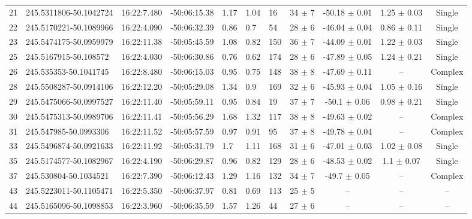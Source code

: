 \begin{table}[htbp!]
\begin{tabular}{llllllllccc}
21  &  245.5311806-50.1042724  &  16:22:7.480  &  -50:06:15.38  &  1.17  &  1.04  &  16  &  34 $\pm$ 7  &  -50.18 $\pm$ 0.01  &  1.25 $\pm$ 0.03  &  Single \\
22  &  245.5170221-50.1089966  &  16:22:4.090  &  -50:06:32.39  &  0.86  &  0.7  &  54  &  28 $\pm$ 6  &  -46.04 $\pm$ 0.04  &  0.86 $\pm$ 0.11  &  Single \\
23  &  245.5474175-50.0959979  &  16:22:11.38  &  -50:05:45.59  &  1.08  &  0.82  &  150  &  36 $\pm$ 7  &  -44.09 $\pm$ 0.01  &  1.22 $\pm$ 0.03  &  Single \\
25  &  245.5167915-50.108572  &  16:22:4.030  &  -50:06:30.86  &  0.76  &  0.62  &  174  &  28 $\pm$ 6  &  -47.89 $\pm$ 0.05  &  1.24 $\pm$ 0.21  &  Single \\
26  &  245.535353-50.1041745  &  16:22:8.480  &  -50:06:15.03  &  0.95  &  0.75  &  148  &  38 $\pm$ 8  &  -47.69 $\pm$ 0.11  &  --  &  Complex \\
28  &  245.5508287-50.0914106  &  16:22:12.20  &  -50:05:29.08  &  1.34  &  0.9  &  169  &  32 $\pm$ 6  &  -45.93 $\pm$ 0.04  &  1.05 $\pm$ 0.16  &  Single \\
29  &  245.5475066-50.0997527  &  16:22:11.40  &  -50:05:59.11  &  0.95  &  0.84  &  19  &  37 $\pm$ 7  &  -50.1 $\pm$ 0.06  &  0.98 $\pm$ 0.21  &  Single \\
30  &  245.5475313-50.0989706  &  16:22:11.41  &  -50:05:56.29  &  1.68  &  1.32  &  117  &  38 $\pm$ 8  &  -49.63 $\pm$ 0.02  &  --  &  Complex \\
31  &  245.547985-50.0993306  &  16:22:11.52  &  -50:05:57.59  &  0.97  &  0.91  &  95  &  37 $\pm$ 8  &  -49.78 $\pm$ 0.04  &  --  &  Complex \\
33  &  245.5496874-50.0921633  &  16:22:11.92  &  -50:05:31.79  &  1.7  &  1.11  &  168  &  31 $\pm$ 6  &  -47.01 $\pm$ 0.03  &  1.02 $\pm$ 0.08  &  Single \\
35  &  245.5174577-50.1082967  &  16:22:4.190  &  -50:06:29.87  &  0.96  &  0.82  &  129  &  28 $\pm$ 6  &  -48.53 $\pm$ 0.02  &  1.1 $\pm$ 0.07  &  Single \\
37  &  245.530804-50.1034521  &  16:22:7.390  &  -50:06:12.43  &  1.29  &  1.16  &  132  &  34 $\pm$ 7  &  -49.7 $\pm$ 0.05  &  --  &  Complex \\
43  &  245.5223011-50.1105471  &  16:22:5.350  &  -50:06:37.97  &  0.81  &  0.69  &  113  &  25 $\pm$ 5  &  --  &  --  &  -- \\
44  &  245.5165096-50.1098853  &  16:22:3.960  &  -50:06:35.59  &  1.57  &  1.26  &  44  &  27 $\pm$ 6  &  --  &  --  &  -- \\

\end{tabular}
\end{table}
